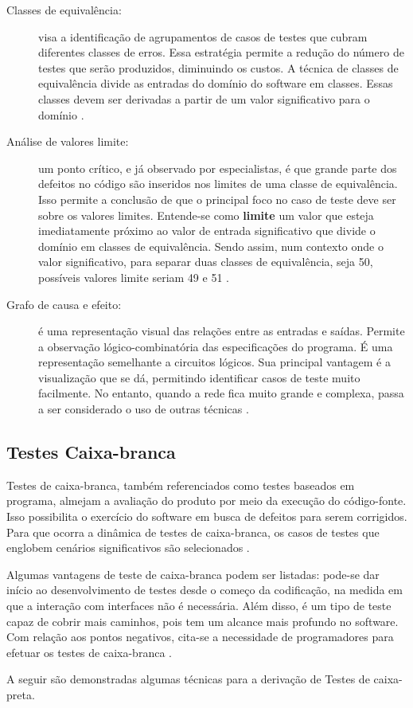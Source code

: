 \begin{description}
\item[Classes de equivalência:] visa a identificação de agrupamentos de casos de testes que cubram diferentes classes de erros. Essa estratégia permite a redução do número de testes que serão produzidos, diminuindo os custos. A técnica de classes de equivalência divide as entradas do domínio do software em classes. Essas classes devem ser derivadas a partir de um valor significativo para o domínio \cite{williams2006}.
\item[Análise de valores limite:] um ponto crítico, e já observado por especialistas, é que grande parte dos defeitos no código são inseridos nos limites de uma classe de equivalência. Isso permite a conclusão de que o principal foco no caso de teste deve ser sobre os valores limites. Entende-se como \textbf{limite} um valor que esteja imediatamente próximo ao valor de entrada significativo que divide o domínio em classes de equivalência. Sendo assim, num contexto onde o valor significativo, para separar duas classes de equivalência, seja 50, possíveis valores limite seriam 49 e 51 \cite{williams2006}.
\item[Grafo de causa e efeito:] é uma representação visual das relações entre as entradas e saídas. Permite a observação lógico-combinatória das especificações do programa. É uma representação semelhante a circuitos lógicos. Sua principal vantagem é a visualização que se dá, permitindo identificar casos de teste muito facilmente. No entanto, quando a rede fica muito grande e complexa, passa a ser considerado o uso de outras técnicas \cite{barbosaEtAl2009}.
\end{description}


\subsection{Testes Caixa-branca}
Testes de caixa-branca, também referenciados como testes baseados em programa, almejam a avaliação do produto por meio da execução do código-fonte. Isso possibilita o exercício do software em busca de defeitos para serem corrigidos. Para que ocorra a dinâmica de testes de caixa-branca, os casos de testes que englobem cenários significativos são selecionados \cite{barbosaEtAl2009}.
\par
\indent Algumas vantagens de teste de caixa-branca podem ser listadas: pode-se dar início ao desenvolvimento de testes desde o começo da codificação, na medida em que a interação com interfaces não é necessária. Além disso, é um tipo de teste capaz de cobrir mais caminhos, pois tem um alcance mais profundo no software. Com relação aos pontos negativos, cita-se a necessidade de programadores para efetuar os testes de caixa-branca \cite{barbosaEtAl2009}.
\par
\indent A seguir são demonstradas algumas técnicas para a derivação de Testes de caixa-preta.


